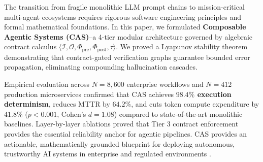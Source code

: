 \documentclass[10pt,twocolumn,letterpaper]{article}
\begin{document}
The transition from fragile monolithic LLM prompt chains to mission-critical multi-agent ecosystems requires rigorous software engineering principles and formal mathematical foundations. In this paper, we formulated \textbf{Composable Agentic Systems (CAS)}--a 4-tier modular architecture governed by algebraic contract calculus $\langle \mathcal{I}, \mathcal{O}, \Phi_{\text{pre}}, \Phi_{\text{post}}, \tau \rangle$. We proved a Lyapunov stability theorem demonstrating that contract-gated verification graphs guarantee bounded error propagation, eliminating compounding hallucination cascades. 

Empirical evaluation across $N = 8,600$ enterprise workflows and $N = 412$ production microservices confirmed that CAS achieves \textbf{$98.4\%$ execution determinism}, reduces MTTR by \textbf{$64.2\%$}, and cuts token compute expenditure by \textbf{$41.8\%$} ($p < 0.001$, Cohen's $d = 1.08$) compared to state-of-the-art monolithic baselines. Layer-by-layer ablations proved that Tier 3 contract enforcement provides the essential reliability anchor for agentic pipelines. CAS provides an actionable, mathematically grounded blueprint for deploying autonomous, trustworthy AI systems in enterprise and regulated environments \cite{arxiv_2501_02497,crossref_10_1201_9788743808145_14,arxiv_2406_00584}.


\par\vspace{0.5em}



\end{document}
